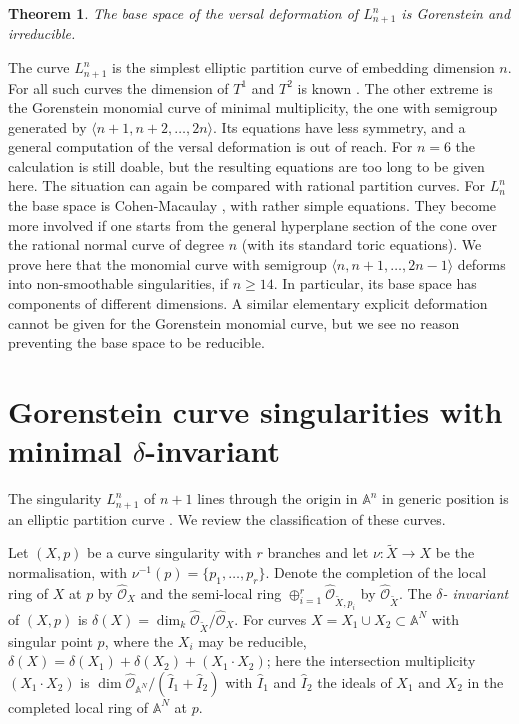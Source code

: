 \documentclass[12pt,a4paper]{amsart}  %
\newcommand{\A}{\mathbb{A}}
\newtheorem*{thmstar}{Theorem}
\theoremstyle{definition}
\theoremstyle{remark}
\begin{document}
\begin{thmstar}
The base space of the versal deformation of $L_{n+1}^n$ is Gorenstein and irreducible.
\end{thmstar}


The curve $L_{n+1}^n$ is the simplest elliptic partition curve 
of embedding dimension $n$. For all such curves the dimension 
of $T^1$ and $T^2$ is known \cite{BC}. The other extreme is the
Gorenstein monomial curve of minimal multiplicity, the
one with semigroup generated by $\langle n+1,n+2,\dots,2n\rangle$.
Its equations have less symmetry, and a general computation  of the 
versal deformation is 
out of reach. For $n=6$  the calculation is still doable, but the resulting equations
are too long to be given here. The situation can again be compared with
rational partition curves. For $L_n^n$ the base space is Cohen-Macaulay
\cite{PR}, with rather simple equations. They become more involved
if one starts from the  general hyperplane section of the cone over the rational normal 
curve of degree $n$ (with its standard toric equations). We prove here that the 
monomial curve with semigroup $\langle n, n+1,\dots,2n-1\rangle$ deforms into
non-smoothable singularities, if $n\geq 14$. In particular, its base space has components
of different dimensions. A similar elementary explicit deformation cannot be given for the
Gorenstein monomial curve, but we see no reason preventing the base space to be reducible.







\section{Gorenstein curve singularities with minimal $\delta$-invariant}
The singularity $L_{n+1}^n$  of $n+1$ lines through the origin in $\A^n$ 
in generic position is an elliptic partition curve \cite{BC}. We review the classification 
of these curves.

Let $(X,p)$ be a curve singularity with $r$ branches and let   
$\nu\colon \widetilde X \to X$ be the normalisation, with 
$\nu^{-1}(p)=\{p_1,\dots,p_r\}$. Denote the completion of the
local ring of $X$ at $p$ by $\widehat {\mathcal O}_X$ and the semi-local ring
$\oplus _{i=1}^r \widehat{\mathcal O}_{\widetilde X,p_i}$ by 
$\widehat {\mathcal O}_{\widetilde X}$. The \textit{$\delta$- invariant}
of $(X,p)$ is $\delta(X)=\dim_k \widehat {\mathcal O}_{\widetilde X}/
\widehat {\mathcal O}_X$.  For curves $X=X_1\cup X_2\subset \A^N$ with singular point 
$p$,
where the $X_i$ may be reducible,
$\delta (X) = \delta(X_1)+\delta(X_2)+(X_1\cdot X_2)$; here the intersection multiplicity
$(X_1\cdot X_2)$ is 
$\dim \widehat {\mathcal O}_{\A^N}/(\widehat I_1+\widehat I_2)$ with 
$\widehat I_1$ and $\widehat I_2$ the ideals of $X_1$ and $X_2$ in the completed
local ring of $\A^N$ at $p$. 
\end{document}
